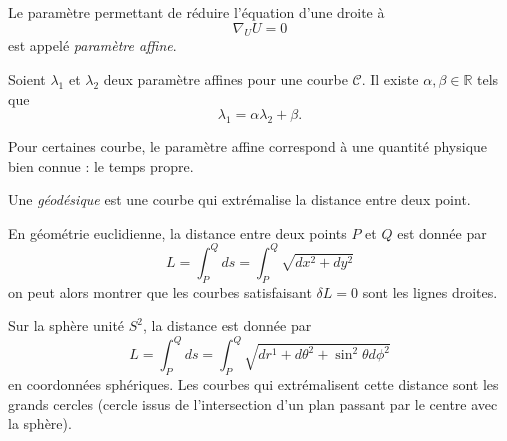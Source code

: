 \documentclass[a4paper,11pt]{report}
\begin{document}
            \begin{defn}
                Le paramètre permettant de réduire l'équation d'une droite à 
                \begin{equation}
                    \nabla_U U = 0
                \end{equation}
                est appelé \textit{paramètre affine}.
            \end{defn}
            
            \begin{prop}\begin{leftbar}
                Soient $\lambda_1$ et $\lambda_2$ deux paramètre affines pour une courbe $\mathscr{C}$. Il existe $\alpha,\beta\in\mathbb{R}$ tels que
                \begin{equation}
                    \lambda_1 = \alpha\lambda_2+\beta.
                \end{equation}
            \end{leftbar}\end{prop}
            
            Pour certaines courbe, le paramètre affine correspond à une quantité physique bien connue : le temps propre.
            
            \begin{defn}
                Une \textit{géodésique} est une courbe qui extrémalise la distance entre deux point.
            \end{defn}
            
            \begin{exmp}
                En géométrie euclidienne, la distance entre deux points $P$ et $Q$ est donnée par 
                \begin{equation}
                    L = \int_P^Q ds = \int_P^Q \sqrt{dx^2+dy^2}
                \end{equation}
                on peut alors montrer que les courbes satisfaisant $\delta L = 0$ sont les lignes droites.
            \end{exmp}
            
            \begin{exmp}
                Sur la sphère unité $S^2$, la distance est donnée par
                \begin{equation}
                    L = \int_P^Qds = \int_P^Q\sqrt{dr^1+d\theta^2+\sin^2\theta d\phi^2}
                \end{equation}
                en coordonnées sphériques. Les courbes qui extrémalisent cette distance sont les grands cercles (cercle issus de l'intersection d'un plan passant par le centre avec la sphère).
            \end{exmp}
            
\end{document}
